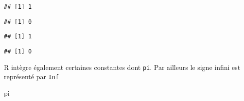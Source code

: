 \documentclass[]{book}
\newenvironment{Shaded}{\begin{snugshade}}{\end{snugshade}}
\newcommand{\DecValTok}[1]{\textcolor[rgb]{0.00,0.00,0.81}{#1}}
\newcommand{\StringTok}[1]{\textcolor[rgb]{0.31,0.60,0.02}{#1}}
\newcommand{\OperatorTok}[1]{\textcolor[rgb]{0.81,0.36,0.00}{\textbf{#1}}}
\newcommand{\NormalTok}[1]{#1}
\theoremstyle{definition}
\theoremstyle{definition}
\theoremstyle{definition}
\theoremstyle{remark}
\begin{document}
\begin{Shaded}
\end{Shaded}

\begin{verbatim}
## [1] 1
\end{verbatim}

\begin{Shaded}
\end{Shaded}

\begin{verbatim}
## [1] 0
\end{verbatim}

\begin{Shaded}
\end{Shaded}

\begin{verbatim}
## [1] 1
\end{verbatim}

\begin{Shaded}
\end{Shaded}

\begin{verbatim}
## [1] 0
\end{verbatim}

R intègre également certaines constantes dont \texttt{pi}. Par ailleurs
le signe infini est représenté par \texttt{Inf}

\begin{Shaded}
\begin{Highlighting}[]
\NormalTok{pi}
\end{Highlighting}
\end{Shaded}
\end{document}
